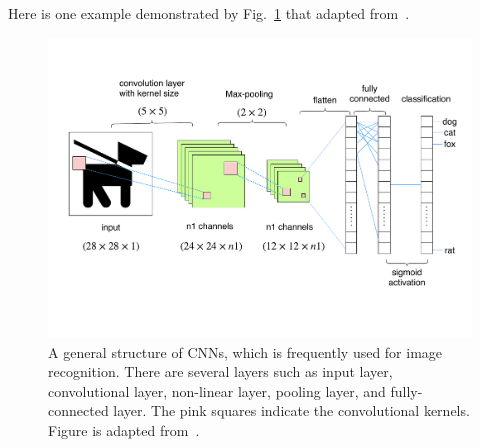 Here is one example demonstrated by Fig.~\ref{fig:cnn} that adapted from~\cite{hijazi2015using}. 

\begin{figure}[h]
\centering
\includegraphics[width=1\textwidth]{images/cnn.pdf}
\caption[Structure of CNNs]{A general structure of CNNs, which is frequently used for image recognition. There are several layers such as input layer, convolutional layer, non-linear layer, pooling layer, and fully-connected layer. The pink squares indicate
the convolutional kernels. Figure is adapted from~\cite{hijazi2015using}.}
\label{fig:cnn}
\end{figure}



